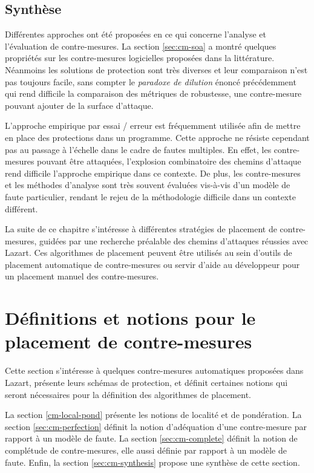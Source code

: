         \subsection{Synthèse}
        \label{sec:cm-concl}
            
            Différentes approches ont été proposées en ce qui concerne l'analyse et l'évaluation de contre-mesures. 
            La section \ref{sec:cm-soa} a montré quelques propriétés sur les contre-mesures logicielles proposées dans la littérature.
            Néanmoins les solutions de protection sont très diverses et leur comparaison n'est pas toujours facile, sans compter le \textit{paradoxe de dilution} énoncé précédemment qui rend difficile la comparaison des métriques de robustesse, une contre-mesure pouvant ajouter de la surface d'attaque.
            
            L'approche empirique par essai / erreur est fréquemment utilisée afin de mettre en place des protections dans un programme. Cette approche ne résiste cependant pas au passage à l'échelle dans le cadre de fautes multiples.
            En effet, les contre-mesures pouvant être attaquées, l'explosion combinatoire des chemins d'attaque rend difficile l'approche empirique dans ce contexte.
            De plus, les contre-mesures et les méthodes d'analyse sont très souvent évaluées vis-à-vis d'un modèle de faute particulier, rendant le rejeu de la méthodologie difficile dans un contexte différent.
            
            La suite de ce chapitre s'intéresse à différentes stratégies de placement de contre-mesures, guidées par une recherche préalable des chemins d'attaques réussies avec Lazart.
            Ces algorithmes de placement peuvent être utilisés au sein d'outils de placement automatique de contre-mesures ou servir d'aide au développeur pour un placement manuel des contre-mesures.
        
    \section{Définitions et notions pour le placement de contre-mesures}
    \label{sec:ch6-defs}
    
        Cette section s'intéresse à quelques contre-mesures automatiques proposées dans Lazart, présente leurs schémas de protection, et définit certaines notions qui seront nécessaires pour la définition des algorithmes de placement.
        
        La section \ref{cm-local-pond} présente les notions de localité et de pondération. 
        La section \ref{sec:cm-perfection} définit la notion d'adéquation d'une contre-mesure par rapport à un modèle de faute. 
        La section \ref{sec:cm-complete} définit la notion de complétude de contre-mesures, elle aussi définie par rapport à un modèle de faute.
        Enfin, la section \ref{sec:cm-synthesis} propose une synthèse de cette section.
            
